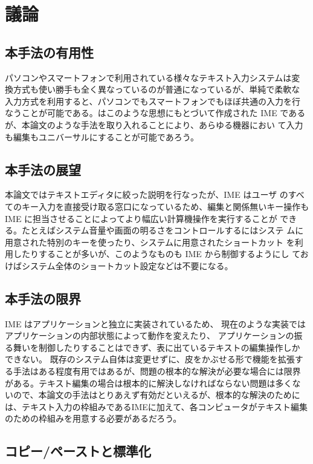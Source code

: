 \section{議論}

\subsection{本手法の有用性}
パソコンやスマートフォンで利用されている様々なテキスト入力システムは変
換方式も使い勝手も全く異なっているのが普通になっているが、単純で柔軟な
入力方式を利用すると、パソコンでもスマートフォンでもほぼ共通の入力を行
なうことが可能である。{\system}はこのような思想にもとづいて作成された IME
であるが、本論文のような手法を取り入れることにより、あらゆる機器におい
て入力も編集もユニバーサルにすることが可能であろう。

\subsection{本手法の展望}
本論文ではテキストエディタに絞った説明を行なったが、IME はユーザ
のすべてのキー入力を直接受け取る窓口になっているため、編集と関係無いキー操作も IME に担当させることによってより幅広い計算機操作を実行することが
できる。たとえばシステム音量や画面の明るさをコントロールするにはシステ
ムに用意された特別のキーを使ったり、システムに用意されたショートカット
を利用したりすることが多いが、このようなものも IME から制御するようにし
ておけばシステム全体のショートカット設定などは不要になる。

\subsection{本手法の限界}

IME はアプリケーションと独立に実装されているため、
現在のような実装ではアプリケーションの内部状態によって動作を変えたり、
アプリケーションの振る舞いを制御したりすることはできず、表に出ているテキストの編集操作しか
できない。 既存のシステム自体は変更せずに、皮をかぶせる形で機能を拡張す
る手法はある程度有用ではあるが、問題の根本的な解決が必要な場合には限界
がある。テキスト編集の場合は根本的に解決しなければならない問題は多くな
いので、本論文の手法はとりあえず有効だといえるが、根本的な解決のために
は、テキスト入力の枠組みであるIMEに加えて、各コンピュータがテキスト編集
のための枠組みを用意する必要があるだろう。

\subsection{コピー/ペーストと標準化}

